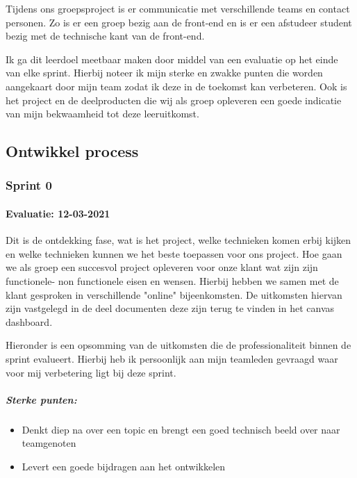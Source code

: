 	Tijdens ons groepsproject is er communicatie met verschillende teams en contact personen.
	Zo is er een groep bezig aan de front-end en is er een afstudeer student bezig met de technische kant van de front-end.


	Ik ga dit leerdoel meetbaar maken door middel van een evaluatie op het einde van elke sprint.
	Hierbij noteer ik mijn sterke en zwakke punten die worden aangekaart door mijn team zodat ik deze in de toekomst kan verbeteren.
	Ook is het project en de deelproducten die wij als groep opleveren een goede indicatie van mijn bekwaamheid tot deze leeruitkomst.

	\newpage
	\bigskip



	\subsection{Ontwikkel process}

	\subsubsection{Sprint 0}
	\paragraph{Evaluatie: 12-03-2021}
	Dit is de ontdekking fase, wat is het project, welke technieken komen erbij kijken
	en welke technieken kunnen we het beste toepassen voor ons project.
	Hoe gaan we als groep een succesvol project opleveren voor onze klant wat zijn zijn functionele- non functionele eisen en wensen.
	Hierbij hebben we samen met de klant gesproken in verschillende "online" bijeenkomsten.
	De uitkomsten hiervan zijn vastgelegd in de deel documenten deze zijn terug te vinden in het canvas dashboard.


	Hieronder is een opsomming van de uitkomsten die de professionaliteit binnen de sprint evalueert.
	Hierbij heb ik persoonlijk aan mijn teamleden gevraagd waar voor mij verbetering ligt bij deze sprint.
	\subparagraph{Sterke punten:}
	\begin{itemize}
		\setlength{\itemsep}{0pt}%
		\setlength{\parskip}{0pt}%
		\item Denkt diep na over een topic en brengt een goed technisch beeld over naar teamgenoten
		\item Levert een goede bijdragen aan het ontwikkelen
	\end{itemize}

